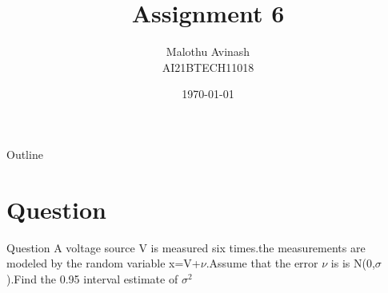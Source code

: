 \documentclass{beamer}
\title{Assignment 6}%
\author{Malothu Avinash \\ AI21BTECH11018}
\date{\today}
\begin{document}
\begin{frame}
    \titlepage 
\end{frame}



\begin{frame}{Outline}
    \tableofcontents
\end{frame}


\section{Question}
\begin{frame}{Question}
A voltage source V is measured six times.the measurements are modeled by the random variable x=V+$\nu$.Assume that the error $\nu$ is is N(0,$\sigma$).Find the 0.95 interval estimate of $\sigma^2$
\end{frame}
\end{document}
